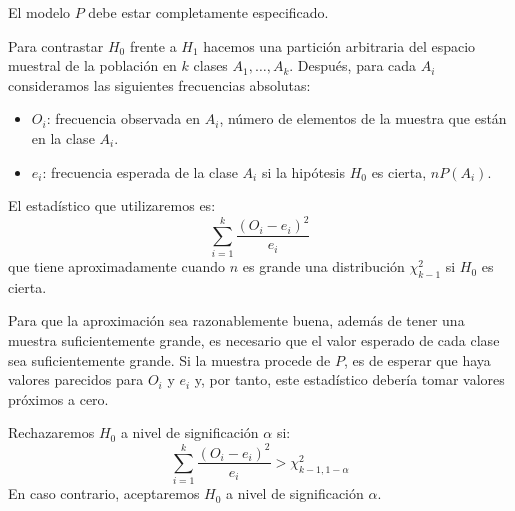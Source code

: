 \begin{note}
    El modelo $P$ debe estar completamente especificado.
\end{note}

Para contrastar $H_0$ frente a $H_1$ hacemos una partición arbitraria del espacio muestral de la población en $k$ clases $A_1, \dots, A_k$.
Después, para cada $A_i$ consideramos las siguientes frecuencias absolutas:
\begin{itemize}
    \item $O_i$: frecuencia observada en $A_i$, número de elementos de la muestra que están en la clase $A_i$.
    \item $e_i$: frecuencia esperada de la clase $A_i$ si la hipótesis $H_0$ es cierta, $nP(A_i)$.
\end{itemize}

El estadístico que utilizaremos es:
$$\sum_{i=1}^k \frac{(O_i-e_i)^2}{e_i}$$
que tiene aproximadamente cuando $n$ es grande una distribución $\chi^2_{k-1}$ si $H_0$ es cierta.

Para que la aproximación sea razonablemente buena, además de tener una muestra suficientemente grande, es necesario que el valor esperado de cada clase sea suficientemente grande.
Si la muestra procede de $P$, es de esperar que haya valores parecidos para $O_i$ y $e_i$ y, por tanto, este estadístico debería tomar valores próximos a cero.

Rechazaremos $H_0$ a nivel de significación $\alpha$ si:
$$\sum_{i=1}^k \frac{(O_i-e_i)^2}{e_i} > \chi^2_{k-1, 1-\alpha}$$
En caso contrario, aceptaremos $H_0$ a nivel de significación $\alpha$.

